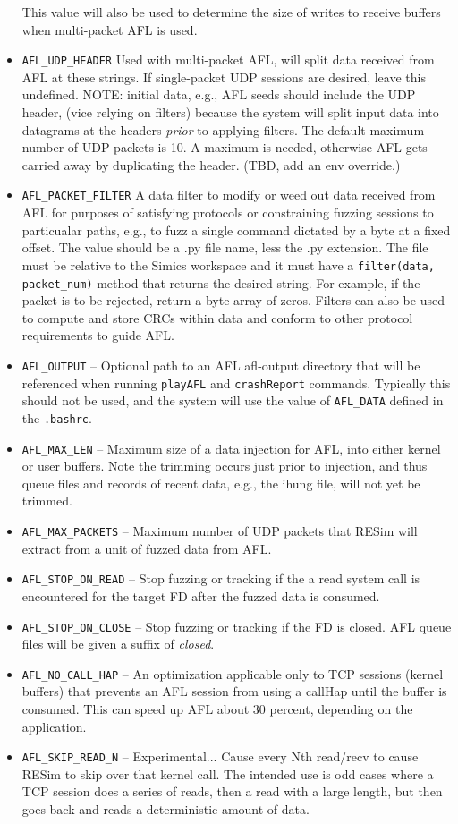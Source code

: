 \documentclass[titlepage]{article}
\begin{document}
\begin{itemize}
This value will also be used to determine the size of writes to receive buffers when multi-packet AFL is used.
\item{\tt AFL\_UDP\_HEADER} Used with multi-packet AFL, will split data received from AFL at these strings.  If single-packet UDP sessions are desired,
leave this undefined. NOTE: initial data, e.g., AFL seeds should include the UDP header, (vice relying on filters) because the system will split input data into datagrams at the
headers \textit{prior} to applying filters.  The default maximum number of UDP packets is 10.  A maximum is needed, otherwise AFL gets carried away by duplicating
the header.  (TBD, add an env override.)
\item{\tt AFL\_PACKET\_FILTER} A data filter to modify or weed out data received from AFL for purposes of satisfying protocols or constraining fuzzing sessions to
particualar paths, e.g., to fuzz a single command dictated by a byte at a fixed offset.  The value should be a .py file name, less the
.py extension.  The file must be relative to the Simics workspace and it must have a {\tt filter(data, packet\_num)} method that returns
the desired string.  For example, if the packet is to be rejected, return a byte array of zeros.  Filters can also be used to 
compute and store CRCs within data and conform to other protocol requirements to guide AFL.  
\item {\tt AFL\_OUTPUT} -- Optional path to an AFL afl-output directory that will be referenced when running {\tt playAFL} and {\tt crashReport} commands. Typically this should not be used, and the system will use the value of {\tt AFL\_DATA} defined in the {\tt .bashrc}.
\item {\tt AFL\_MAX\_LEN} -- Maximum size of a data injection for AFL, into either kernel or user buffers. Note the trimming occurs just prior to injection,
and thus queue files and records of recent data, e.g., the ihung file, will not yet be trimmed.
\item {\tt AFL\_MAX\_PACKETS} -- Maximum number of UDP packets that RESim will extract from a unit of fuzzed data from AFL.
\item {\tt AFL\_STOP\_ON\_READ} -- Stop fuzzing or tracking if the a read system call is encountered for the target FD after the fuzzed data is consumed.
\item {\tt AFL\_STOP\_ON\_CLOSE} -- Stop fuzzing or tracking if the FD is closed.  AFL queue files will be given a suffix of \textit{closed}.
\item {\tt AFL\_NO\_CALL\_HAP} -- An optimization applicable only to TCP sessions (kernel buffers) that prevents an AFL session 
from using a callHap until the buffer is consumed.  This can speed up AFL about 30 percent, depending on the application.
\item {\tt AFL\_SKIP\_READ\_N} -- Experimental... Cause every Nth read/recv to cause RESim to skip over that kernel call.  The intended use is odd
cases where a TCP session does a series of reads, then a read with a large length, but then goes back and reads a deterministic amount of data.


\end{itemize}
\end{document}
